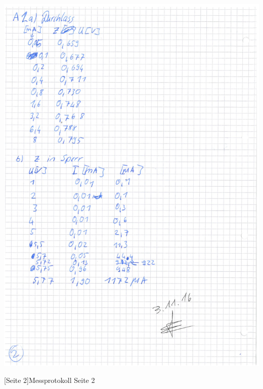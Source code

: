         \begin{center}
    		\includegraphics[scale=0.65]{Daten/1_Seite_1.jpg}
    	\end{center}
    	[Seite 2]{Messprotokoll Seite 2}
    	\pagebreak
    	
